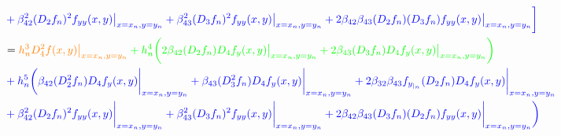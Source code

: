\documentclass[12 pt]{article}
\begin{document}
\begin{align*}
	&\color{blue}+\beta_{42}^{2}(D_{2}f_{n})^{2}f_{yy}(x,y)\big\vert_{x = x_{n}, y= y_{n}} + \beta_{43}^{2}(D_{3}f_{n})^{2}f_{yy}(x,y)\big\vert_{x = x_{n}, y= y_{n}} + 2\beta_{42}\beta_{43}(D_{2}f_{n})(D_{3}f_{n})f_{yy}(x,y)\big\vert_{x = x_{n}, y= y_{n}}\bigg]\\
	&=  \color{orange}h_{n}^{3}D_{4}^{2}f(x,y)\big\vert_{x = x_{n}, y= y_{n}} \color{green}+ h_{n}^{4}\bigg(2\beta_{42}(D_{2}f_{n})D_{4}f_{y}(x,y)\big\vert_{x = x_{n}, y= y_{n}} + 2\beta_{43}(D_{3}f_{n})D_{4}f_{y}(x,y)\big\vert_{x = x_{n}, y= y_{n}}\bigg) \\
	&\color{blue}+h_{n}^{5}\bigg(\beta_{42}(D_{2}^{2}f_{n})D_{4}f_{y}(x,y)\bigg\vert_{x=x_{n}, y= y_{n}} + \beta_{43}(D_{3}^{2}f_{n})D_{4}f_{y}(x,y)\bigg\vert_{x=x_{n}, y= y_{n}} + 2\beta_{32}\beta_{43}f_{y_{|_{n}}}(D_{2}f_{n})D_{4}f_{y}(x,y)\bigg\vert_{x=x_{n}, y= y_{n}}\\
	&\color{blue}+ \beta_{42}^{2}(D_{2}f_{n})^{2}f_{yy}(x,y)\bigg\vert_{x=x_{n}, y= y_{n}} + \beta_{43}^{2}(D_{3}f_{n})^{2}f_{yy}(x,y)\bigg\vert_{x=x_{n}, y= y_{n}} + 2\beta_{42}\beta_{43}(D_{3}f_{n})(D_{2}f_{n})f_{yy}(x,y)\bigg\vert_{x=x_{n}, y= y_{n}}\bigg)
\end{align*}
\end{document}

